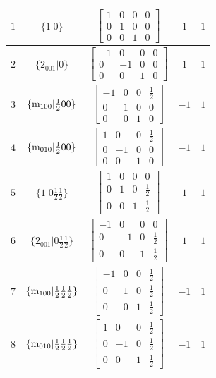 \documentclass[fleqn,8pt]{jsarticle}
\begin{document}
\begin{longtable}{ccccc}
$ 1 $ & $ \{1|0\} $ & $ \begin{bmatrix} 1 & 0 & 0 & 0 \\ 0 & 1 & 0 & 0 \\ 0 & 0 & 1 & 0 \end{bmatrix} $ & $ 1 $ & $ 1 $ \\ \hline
$ 2 $ & $ \{2{}_{001}|0\} $ & $ \begin{bmatrix} -1 & 0 & 0 & 0 \\ 0 & -1 & 0 & 0 \\ 0 & 0 & 1 & 0 \end{bmatrix} $ & $ 1 $ & $ 1 $ \\ \hline
$ 3 $ & $ \{{\rm m}_{100}|\frac{1}{2} 0 0\} $ & $ \begin{bmatrix} -1 & 0 & 0 & \frac{1}{2} \\ 0 & 1 & 0 & 0 \\ 0 & 0 & 1 & 0 \end{bmatrix} $ & $ -1 $ & $ 1 $ \\ \hline
$ 4 $ & $ \{{\rm m}_{010}|\frac{1}{2} 0 0\} $ & $ \begin{bmatrix} 1 & 0 & 0 & \frac{1}{2} \\ 0 & -1 & 0 & 0 \\ 0 & 0 & 1 & 0 \end{bmatrix} $ & $ -1 $ & $ 1 $ \\ \hline
$ 5 $ & $ \{1|0 \frac{1}{2} \frac{1}{2}\} $ & $ \begin{bmatrix} 1 & 0 & 0 & 0 \\ 0 & 1 & 0 & \frac{1}{2} \\ 0 & 0 & 1 & \frac{1}{2} \end{bmatrix} $ & $ 1 $ & $ 1 $ \\ \hline
$ 6 $ & $ \{2{}_{001}|0 \frac{1}{2} \frac{1}{2}\} $ & $ \begin{bmatrix} -1 & 0 & 0 & 0 \\ 0 & -1 & 0 & \frac{1}{2} \\ 0 & 0 & 1 & \frac{1}{2} \end{bmatrix} $ & $ 1 $ & $ 1 $ \\ \hline
$ 7 $ & $ \{{\rm m}_{100}|\frac{1}{2} \frac{1}{2} \frac{1}{2}\} $ & $ \begin{bmatrix} -1 & 0 & 0 & \frac{1}{2} \\ 0 & 1 & 0 & \frac{1}{2} \\ 0 & 0 & 1 & \frac{1}{2} \end{bmatrix} $ & $ -1 $ & $ 1 $ \\ \hline
$ 8 $ & $ \{{\rm m}_{010}|\frac{1}{2} \frac{1}{2} \frac{1}{2}\} $ & $ \begin{bmatrix} 1 & 0 & 0 & \frac{1}{2} \\ 0 & -1 & 0 & \frac{1}{2} \\ 0 & 0 & 1 & \frac{1}{2} \end{bmatrix} $ & $ -1 $ & $ 1 $ \\ \hline

\end{longtable}
\end{document}
